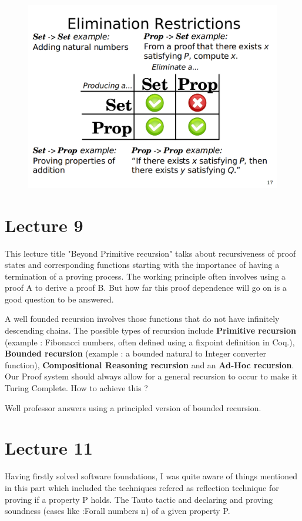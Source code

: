 \documentclass[paper=a4, fontsize=11pt]{scrartcl}
\numberwithin{equation}{section}		%
\numberwithin{figure}{section}			%
\numberwithin{table}{section}				%
\begin{document}
\begin{itemize}
{\begin{figure}[!htb]
\centering
  \includegraphics[width=\linewidth]{elim_restrict.png}
\end{figure}

}
\end{itemize}

\section{Lecture 9}
This lecture title "Beyond Primitive recursion" talks about recursiveness of proof states and corresponding functions starting with the importance of having a termination of a proving process. The working principle often involves using a proof A to derive a proof B. But how far this proof dependence will go on is a good question to be answered.

A well founded recursion involves those functions that do not have infinitely descending chains. The possible types of recursion include \textbf{Primitive recursion} (example : Fibonacci numbers, often defined using a fixpoint definition in Coq.), \textbf{Bounded recursion} (example : a bounded natural to Integer converter function), \textbf{Compositional Reasoning recursion} and an \textbf{Ad-Hoc recursion}. Our Proof system should always allow for a general recursion to occur to make it Turing Complete. How to achieve this ?

Well professor answers using a principled version of bounded recursion. 

\section{Lecture 11}
Having firstly solved software foundations, I was quite aware of things mentioned in this part which included the techniques refered as reflection technique for proving if a property P holds. The Tauto tactic and declaring and proving soundness (cases like :Forall numbers n) of a given property P.
\end{document}

